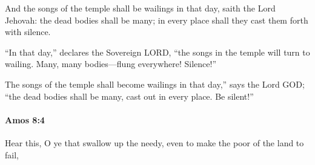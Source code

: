 			\begin{versebox}
					\item[BHS] 
					\item[LXX] 
					\item[ASV] And the songs of the temple shall be wailings in that day, saith the Lord Jehovah: the dead bodies shall be many; in every place shall they cast them forth with silence.
					\item[NIV] “In that day,” declares the Sovereign LORD, “the songs in the temple will turn to wailing. Many, many bodies—flung everywhere! Silence!”
					\item[NRSV] The songs of the temple shall become wailings in that day,” says the Lord GOD; “the dead bodies shall be many, cast out in every place. Be silent!”
			\end{versebox}

		\paragraph{Amos 8:4} %
			\label{AMOS-8-4}

			Hear this, O ye that swallow up the needy, even to make the poor of the land to fail,

